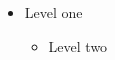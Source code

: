 \begin{itemize}
  \item Level one
    \begin{itemize}
      \item Level two
    \end{itemize}
\end{itemize}
